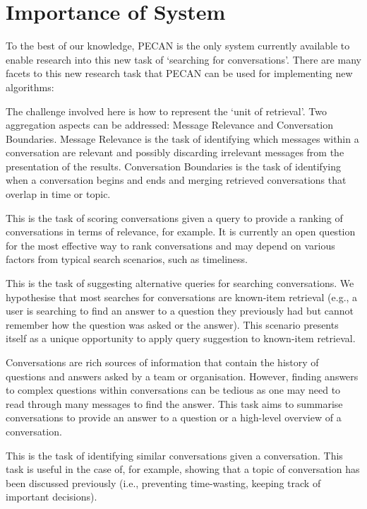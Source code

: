 \section{Importance of System}
\label{sec:importance}

To the best of our knowledge, PECAN is the only system currently available to enable research into this new task of `searching for conversations'. There are many facets to this new research task that PECAN can be used for implementing new algorithms:

\begin{description}[noitemsep,leftmargin=8pt]
\item[Conversation Aggregations:] The challenge involved here is how to represent the `unit of retrieval'. Two aggregation aspects can be addressed: Message Relevance and Conversation Boundaries. Message Relevance is the task of identifying which messages within a conversation are relevant and possibly discarding irrelevant messages from the presentation of the results. Conversation Boundaries is the task of identifying when a conversation begins and ends and merging retrieved conversations that overlap in time or topic.
\item[Conversation Scoring:] This is the task of scoring conversations given a query to provide a ranking of conversations in terms of relevance, for example. It is currently an open question for the most effective way to rank conversations and may depend on various factors from typical search scenarios, such as timeliness.
\item[Query Suggestion:] This is the task of suggesting alternative queries for searching conversations. We hypothesise that most searches for conversations are known-item retrieval (e.g., a user is searching to find an answer to a question they previously had but cannot remember how the question was asked or the answer). This scenario presents itself as a unique opportunity to apply query suggestion to known-item retrieval.
\item[Conversation Summarisation:] Conversations are rich sources of information that contain the history of questions and answers asked by a team or organisation. However, finding answers to complex questions within conversations can be tedious as one may need to read through many messages to find the answer. This task aims to summarise conversations to provide an answer to a question or a high-level overview of a conversation.
\item[Related Conversations:] This is the task of identifying similar conversations given a conversation. This task is useful in the case of, for example, showing that a topic of conversation has been discussed previously (i.e., preventing time-wasting, keeping track of important decisions).
\end{description}
 
 